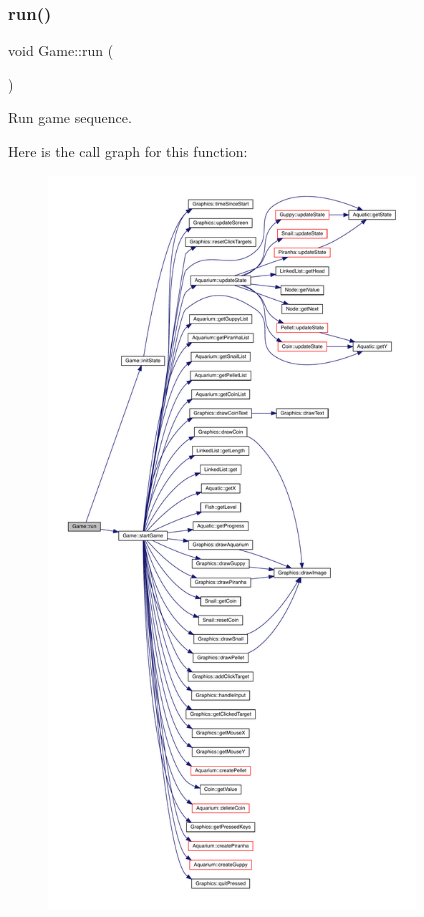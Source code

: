 \subsubsection{\texorpdfstring{run()}{run()}}
{\footnotesize\ttfamily void Game\+::run (\begin{DoxyParamCaption}{ }\end{DoxyParamCaption})}



Run game sequence. 

Here is the call graph for this function\+:\nopagebreak
\begin{figure}[H]
\begin{center}
\leavevmode
\includegraphics[height=550pt]{class_game_a1ab78f5ed0d5ea879157357cf2fb2afa_cgraph}
\end{center}
\end{figure}
